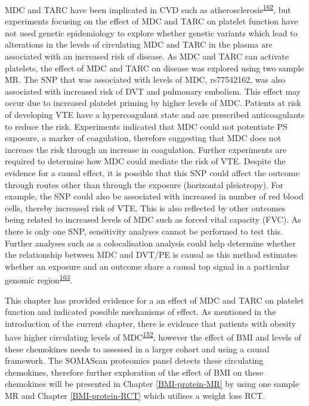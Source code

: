 \documentclass[11pt,twoside]{bristolthesis}
\begin{document}
MDC and TARC have been implicated in CVD such as atherosclerosis\textsuperscript{\protect\hyperlink{ref-Weber2004}{162}}, but experiments focusing on the effect of MDC and TARC on platelet function have not used genetic epidemiology to explore whether genetic variants which lead to alterations in the levels of circulating MDC and TARC in the plasma are associated with an increased risk of disease. As MDC and TARC can activate platelets, the effect of MDC and TARC on disease was explored using two sample MR. The SNP that was associated with levels of MDC, rs77542162, was also associated with increased risk of DVT and pulmonary embolism. This effect may occur due to increased platelet priming by higher levels of MDC. Patients at risk of developing VTE have a hypercoagulant state and are prescribed anticoagulants to reduce the risk. Experiments indicated that MDC could not potentiate PS exposure, a marker of coagulation, therefore suggesting that MDC does not increaes the risk through an increase in coagulation. Further experiments are required to determine how MDC could mediate the risk of VTE. Despite the evidence for a causal effect, it is possible that this SNP could affect the outcome through routes other than through the exposure (horizontal pleiotropy). For example, the SNP could also be associated with increased in number of red blood cells, thereby increased risk of VTE. This is also reflected by other outcomes being related to increased levels of MDC such as forced vital capacity (FVC). As there is only one SNP, sensitivity analyses cannot be performed to test this. Further analyses such as a colocalisation analysis could help determine whether the relationship between MDC and DVT/PE is causal as this method estimates whether an exposure and an outcome share a causal top signal in a particular genomic region\textsuperscript{\protect\hyperlink{ref-Giambartolomei2014}{163}}.

This chapter has provided evidence for a an effect of MDC and TARC on platelet function and indicated possible mechanisms of effect. As mentioned in the introduction of the current chapter, there is evidence that patients with obesity have higher circulating levels of MDC\textsuperscript{\protect\hyperlink{ref-Safa2016}{152}}, however the effect of BMI and levels of these chemokines needs to assessed in a larger cohort and using a causal framework. The SOMAScan proteomics panel detects these circulating chemokines, therefore further exploration of the effect of BMI on these chemokines will be presented in Chapter \ref{BMI-protein-MR} by using one sample MR and Chapter \ref{BMI-protein-RCT} which utilises a weight loss RCT.
\end{document}
